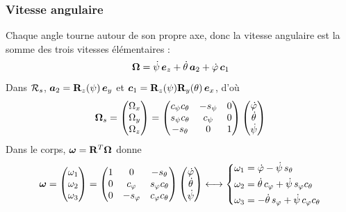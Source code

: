 \subsubsection{Vitesse angulaire}

Chaque angle tourne autour de son propre axe, donc la vitesse angulaire
est la somme des trois vitesses élémentaires :
\[
    \bm{\Omega} = \dot\psi\,\bm{e}_z + \dot\theta\,\bm{a}_2
    + \dot\varphi\,\bm{c}_1
\]
Dans $\mathcal{R}_{s}$, $\bm{a}_2 = \mathbf{R}_z(\psi)\,\bm{e}_y$ et
$\bm{c}_1 = \mathbf{R}_z(\psi)\mathbf{R}_y(\theta)\,\bm{e}_x$, d'où
\[
    \bm{\Omega}_s = \begin{pmatrix}
        \Omega_x\\ \Omega_y\\ \Omega_z
    \end{pmatrix}
    = \begin{pmatrix}
        c_\psi c_\theta & -s_\psi & 0\\
        s_\psi c_\theta & c_\psi & 0\\
        -s_\theta & 0 & 1
    \end{pmatrix}
    \begin{pmatrix}
        \dot\varphi\\ \dot\theta\\ \dot\psi
    \end{pmatrix}
\]
Dans le corps, $\bm{\omega} = \mathbf{R}^T\bm{\Omega}$ donne
\[
    \bm{\omega} = \begin{pmatrix}
        \omega_1\\ \omega_2\\ \omega_3
    \end{pmatrix}
    = \begin{pmatrix}
        1 & 0 & -s_\theta\\
        0 & c_\varphi & s_\varphi c_\theta\\
        0 & -s_\varphi & c_\varphi c_\theta
    \end{pmatrix}
    \begin{pmatrix}
        \dot\varphi\\ \dot\theta\\ \dot\psi
    \end{pmatrix}
    \longleftrightarrow
    \left\{
    \begin{aligned}
        \omega_1 &= \dot\varphi - \dot\psi\,s_\theta\\
        \omega_2 &= \dot\theta\,c_\varphi + \dot\psi\,s_\varphi c_\theta\\
        \omega_3 &= -\dot\theta\,s_\varphi + \dot\psi\,c_\varphi c_\theta
    \end{aligned}
    \right.
\]
